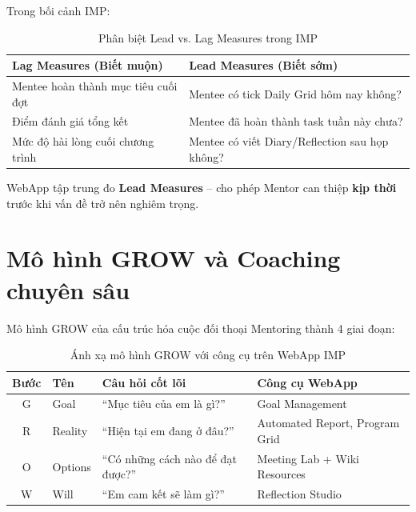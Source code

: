 Trong bối cảnh IMP:

\begin{table}[H]
  \centering
  \begin{tabularx}{\textwidth}{|L|L|}
    \hline
     \textbf{\color{white} Lag Measures (Biết muộn)} & \textbf{\color{white} Lead Measures (Biết sớm)} \\ \hline
    Mentee hoàn thành mục tiêu cuối đợt & Mentee có tick Daily Grid hôm nay không? \\ \hline
    Điểm đánh giá tổng kết & Mentee đã hoàn thành task tuần này chưa? \\ \hline
    Mức độ hài lòng cuối chương trình & Mentee có viết Diary/Reflection sau họp không? \\ \hline
  \end{tabularx}
  \caption{Phân biệt Lead vs. Lag Measures trong IMP}
\end{table}

WebApp tập trung đo \textbf{Lead Measures} -- cho phép Mentor can thiệp \textbf{kịp thời} trước khi vấn đề trở nên nghiêm trọng.

\section{Mô hình GROW và Coaching chuyên sâu}

Mô hình GROW của \citet{grow2009} cấu trúc hóa cuộc đối thoại Mentoring thành 4 giai đoạn:

\begin{table}[H]
  \centering
  \begin{tabularx}{\textwidth}{|c|l|L|L|}
    \hline
     \textbf{\color{white} Bước} & \textbf{\color{white} Tên} & \textbf{\color{white} Câu hỏi cốt lõi} & \textbf{\color{white} Công cụ WebApp} \\ \hline
    G & Goal & ``Mục tiêu của em là gì?'' & Goal Management \\ \hline
    R & Reality & ``Hiện tại em đang ở đâu?'' & Automated Report, Program Grid \\ \hline
    O & Options & ``Có những cách nào để đạt được?'' & Meeting Lab + Wiki Resources \\ \hline
    W & Will & ``Em cam kết sẽ làm gì?'' & Reflection Studio \\ \hline
  \end{tabularx}
  \caption{Ánh xạ mô hình GROW với công cụ trên WebApp IMP}
\end{table}

